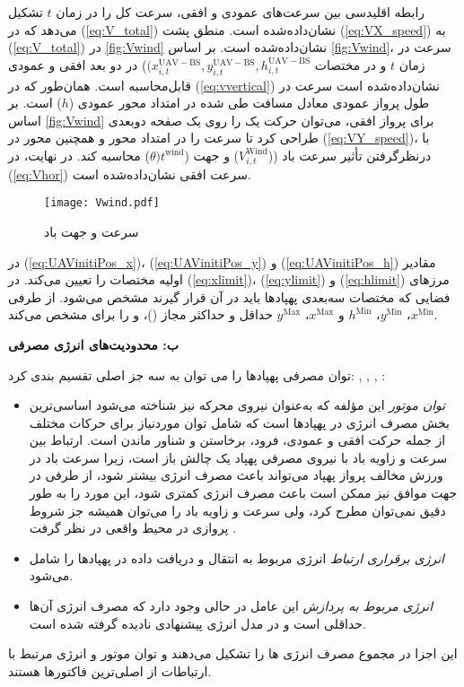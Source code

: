 رابطه اقلیدسی بین سرعت‌های عمودی و افقی، سرعت کل  را در زمان $t$ تشکیل می‌دهد که در (\autoref{eq:V_total}) نشان‌داده‌شده است. منطق پشت (\autoref{eq:VX_speed}) به (\ref{eq:V_total}) در \autoref{fig:Vwind} نشان‌داده‌شده است. بر اساس \autoref{fig:Vwind}، سرعت  در زمان $t$ و در مختصات $ (x_{i,t}^ \mathrm{ \mathrm{ \mathrm{{UAV-BS}}}}, y_{i,t}^ \mathrm{ \mathrm{ \mathrm{{UAV-BS}}}}, h_{i,t}^ \mathrm{UAV-BS}$) در دو بعد افقی و عمودی قابل‌محاسبه است. همان‌طور که در (\autoref{eq:vvertical}) نشان‌داده‌شده است سرعت  در طول پرواز عمودی معادل مسافت طی شده در امتداد محور عمودی ($h$) است. بر اساس \autoref{fig:Vwind} برای پرواز افقی، می‌توان حرکت یک  را روی یک صفحه دوبعدی طراحی کرد تا سرعت  را در امتداد محور  و همچنین محور  در (\autoref{eq:VY_speed})، با درنظرگرفتن تأثیر سرعت باد (($V_{i,t}^{\mathrm{Wind}}$) و جهت ($\theta) {t}^{\mathrm{wind}}$) محاسبه کند. در نهایت، در (\autoref{eq:Vhor}) سرعت افقی  نشان‌داده‌شده است.
\begin{figure}
\texttt{[image: Vwind.pdf]}
\caption[%
سرعت و جهت باد]{سرعت و جهت باد} %
\label{fig:Vwind}
\end{figure}

در (\autoref{eq:UAVinitiPos_x})، (\autoref{eq:UAVinitiPos_y}) و (\autoref{eq:UAVinitiPos_h}) مقادیر اولیه مختصات  را تعیین می‌کند. در (\autoref{eq:xlimit})، (\autoref{eq:ylimit}) و (\autoref{eq:hlimit}) مرزهای فضایی که مختصات سه‌بعدی پهپادها باید در آن قرار گیرند مشخص می‌شود. از طرفی $x^{\mathrm{Min}}$، $y^{\mathrm{Min}}$، $h^{\mathrm{Min}}$ و $x^{\mathrm{Max}}$، $y^{\mathrm{Max}}$ حداقل و حداکثر مجاز ()،  و  را برای  مشخص می‌کند.

\textbf{ب: محدودیت‌های انرژی مصرفی}

توان مصرفی پهپادها را می توان به سه جز اصلی تقسیم بندی کرد: \cite{Aloqaily2022}, \cite{9700536}, \cite{9708417}, \cite{Zhou2023}:
\begin{itemize}
	\item 
	\textit{توان موتور} 
	این مؤلفه که به‌عنوان نیروی محرکه نیز شناخته می‌شود اساسی‌ترین بخش مصرف انرژی در پهپادها است که شامل توان موردنیاز برای حرکات مختلف  از جمله حرکت افقی و عمودی، فرود، برخاستن و شناور ماندن است. ارتباط بین سرعت و زاویه باد با نیروی مصرفی پهپاد یک چالش باز است، زیرا سرعت باد در ورزش مخالف پرواز پهپاد می‌تواند باعث مصرف انرژی بیشتر شود، از طرفی در جهت موافق نیز ممکن است باعث مصرف انرژی کمتری شود، این مورد را به طور دقیق نمی‌توان مطرح کرد، ولی سرعت و زاویه باد را می‌توان همیشه جز شروط پروازی در محیط واقعی در نظر گرفت \cite{10.1007/978-3-319-99996-8_16}.
	\item 
	\textit{انرژی برقراری ارتباط} 
	انرژی مربوط به انتقال و دریافت داده در پهپادها را شامل می‌شود.
	\item 
	\textit{انرژی مربوط به پردازش}
	این عامل در حالی وجود دارد که مصرف انرژی آن‌ها حداقلی است و در مدل انرژی پیشنهادی نادیده گرفته شده است.	
	\end{itemize}
	این اجزا در مجموع مصرف انرژی  ها را تشکیل می‌دهند و توان موتور و انرژی مرتبط با ارتباطات از اصلی‌ترین فاکتورها هستند.


